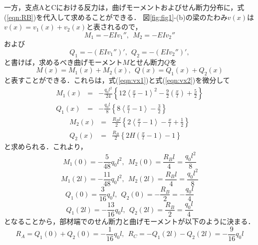 \documentclass[10pt,a4j]{jarticle}
\begin{document}
\begin{enumerate}
一方，支点AとCにおける反力は，曲げモーメントおよびせん断力分布に，式(\ref{eqn:RB})を代入して求めることができる．
図\ref{fig:fig1}-(b)の梁のたわみ$v(x)$は$v(x)=v_1(x)+v_2(x)$と表されるので，
\begin{equation}
	M_1=-EIv_1'', \ \ M_2=-EIv_2''
\end{equation}
および
\begin{equation}
	Q_1=-(EIv_1'')', \ \ Q_2=-(EIv_2'')',
\end{equation}
と書けば，求めるべき曲げモーメント$M$とせん断力$Q$を
\begin{equation}
	M(x)=M_1(x)+M_2(x),  \  \
	Q(x)=Q_1(x)+Q_2(x)
\end{equation}
と表すことができる．これらは，式(\ref{eqn:vx1})と式(\ref{eqn:vx2})を微分して
\begin{eqnarray}
	M_1(x) & =& 
	-\frac{q_0l^2}{24}\left\{ 
	12\left<\frac{x}{l}-1\right>^2 - \frac{9}{2}\left(\frac{x}{l}\right) + \frac{5}{2}
	\right\}
	\label{eqn:M1}
	\\
	Q_1(x) & =& 
	-\frac{q_0l}{8}\left\{ 
	8\left<\frac{x}{l}-1\right> - \frac{3}{2}
	\right\}
	\label{eqn:Q1}
\end{eqnarray}
\begin{eqnarray}
	M_2(x) & =& 
	\frac{R_Bl}{2}\left\{ 
	2\left<\frac{x}{l} - 1\right> -\frac{x}{l} + \frac{1}{2}
	\right\}
	\label{eqn:M2}
	\\
	Q_2(x) & =& 
	\frac{R_B}{2}\left\{ 
	2H\left(\frac{x}{l}-1\right)-1
	\right\}
	\label{eqn:Q2}
\end{eqnarray}
と求められる．これより，
\begin{equation}
	M_1(0)=-\frac{5}{48}q_0l^2, \ \ M_2(0)=\frac{R_Bl}{4}=\frac{q_0l^2}{8}
\end{equation}
\begin{equation}
	M_1(2l)=-\frac{11}{48}q_0l^2, \ \ M_2(2l)=\frac{R_Bl}{4}=\frac{q_0l^2}{8}
\end{equation}
\begin{equation}
	Q_1(0)=\frac{3}{16}q_0l, \ \ Q_2(0)=-\frac{R_B}{2}=-\frac{q_0l}{4}
\end{equation}
\begin{equation}
	Q_1(2l)=-\frac{13}{16}q_0l, \ \ Q_2(2l)=\frac{R_B}{2}=\frac{q_0l}{4}
\end{equation}
となることから，部材端でのせん断力と曲げモーメントが以下のように決まる．
\begin{equation}
	R_A=Q_1(0)+Q_2(0)= -\frac{1}{16}q_0l, \ \ R_C=-Q_1(2l)-Q_2(2l)=-\frac{9}{16}q_0l
\end{equation}
\begin{equation}

\end{equation}
\end{enumerate}
\end{document}
